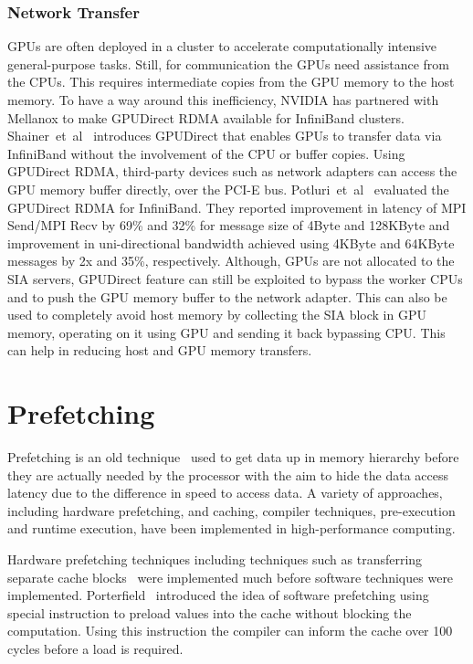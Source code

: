 \subsubsection{Network Transfer}
GPUs are often deployed in a cluster to accelerate computationally intensive
general-purpose tasks. Still, for communication the GPUs need assistance from the CPUs.
This requires intermediate copies from the GPU memory to the host memory. To have
a way around this inefficiency, NVIDIA has partnered with Mellanox to make GPUDirect
RDMA available for InfiniBand clusters. Shainer~et~al~\cite{Shainer2011} introduces
GPUDirect that enables GPUs to transfer data via InfiniBand without the  involvement
of the CPU or buffer copies. Using GPUDirect RDMA, third-party devices such as
network adapters can access the GPU memory buffer directly, over the PCI-E bus.
Potluri~et~al~\cite{6687341} evaluated the GPUDirect RDMA for InfiniBand. They reported
improvement in latency of MPI Send/MPI Recv by 69\% and 32\% for message size of
4Byte and 128KByte and improvement in uni-directional bandwidth achieved using
4KByte and 64KByte messages by 2x and 35\%, respectively.
Although, GPUs are not allocated to the SIA servers, GPUDirect feature can still
be exploited to bypass the worker CPUs and to push the GPU memory buffer to the network
adapter. This can also be used to completely avoid host memory by collecting the
SIA block in GPU memory, operating on it using GPU and sending it back bypassing
CPU. This can help in reducing host and GPU memory transfers.

\section{Prefetching}
Prefetching is an old technique~\cite{anacker68}\cite{Smith1982}\cite{Vanderwiel2000}
used to get data up in memory hierarchy before they are actually needed by the processor
with the aim to hide the data access latency due to the difference in speed to access
data. A variety of approaches, including hardware prefetching, and caching, compiler
techniques, pre-execution and runtime execution, have been implemented in
high-performance computing.

Hardware prefetching techniques including techniques such as transferring separate
cache blocks~\cite{Smith1978} were implemented much before software techniques were
implemented. Porterfield~\cite{Porterfield1989} introduced the idea of software prefetching
using special instruction to preload values into the cache without blocking the
computation. Using this instruction the compiler can inform the cache over 100
cycles before a load is required.

